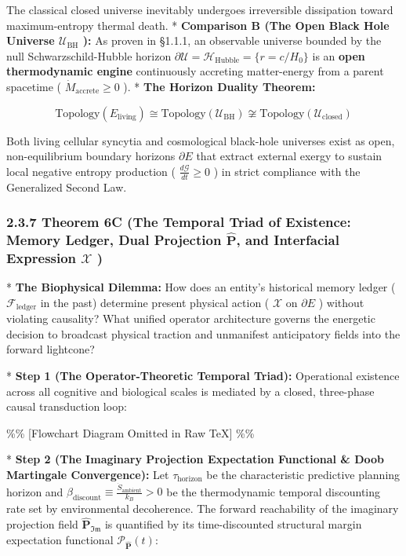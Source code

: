 \documentclass[11pt,a4paper]{article}
\theoremstyle{definition}
\theoremstyle{remark}
\begin{document}
The classical closed universe inevitably undergoes irreversible dissipation toward maximum-entropy thermal death.
* \textbf{Comparison B (The Open Black Hole Universe $\mathcal{U}_{\text{BH}}$ ):}
As proven in \S 1.1.1, an observable universe bounded by the null Schwarzschild-Hubble horizon $\partial \mathcal{U} = \mathcal{H}_{\text{Hubble}} = \{r = c/H_0\}$ is an \textbf{open thermodynamic engine} continuously accreting matter-energy from a parent spacetime ( $\dot{M}_{\text{accrete}} \ge 0$ ).
* \textbf{The Horizon Duality Theorem:}


\begin{equation}
\boxed{\text{Topology}(E_{\text{living}}) \cong \text{Topology}(\mathcal{U}_{\text{BH}}) \not\cong \text{Topology}(\mathcal{U}_{\text{closed}})}
\end{equation}


Both living cellular syncytia and cosmological black-hole universes exist as open, non-equilibrium boundary horizons $\partial E$ that extract external exergy to sustain local negative entropy production ( $\frac{d\mathcal{G}}{dt} \ge 0$ ) in strict compliance with the Generalized Second Law.

\subsubsection{2.3.7 Theorem 6C (The Temporal Triad of Existence: Memory Ledger, Dual Projection $\hat{\mathbf{P}}$, and Interfacial Expression $\boldsymbol{\mathcal{X}}$ )}
* \textbf{The Biophysical Dilemma:} How does an entity's historical memory ledger ( $\mathcal{F}_{\text{ledger}}$ in the past) determine present physical action ( $\boldsymbol{\mathcal{X}}$ on $\partial E$ ) without violating causality? What unified operator architecture governs the energetic decision to broadcast physical traction and unmanifest anticipatory fields into the forward lightcone?

* \textbf{Step 1 (The Operator-Theoretic Temporal Triad):}
Operational existence across all cognitive and biological scales is mediated by a closed, three-phase causal transduction loop:

\%\% [Flowchart Diagram Omitted in Raw TeX] \%\%

* \textbf{Step 2 (The Imaginary Projection Expectation Functional \& Doob Martingale Convergence):}
Let $\tau_{\text{horizon}}$ be the characteristic predictive planning horizon and $\beta_{\text{discount}} \equiv \frac{\dot{S}_{\text{ambient}}}{k_B} > 0$ be the thermodynamic temporal discounting rate set by environmental decoherence. The forward reachability of the imaginary projection field $\hat{\mathbf{P}}_{\mathfrak{Im}}$ is quantified by its time-discounted structural margin expectation functional $\mathcal{P}_{\hat{\mathbf{P}}}(t)$:
\end{document}
